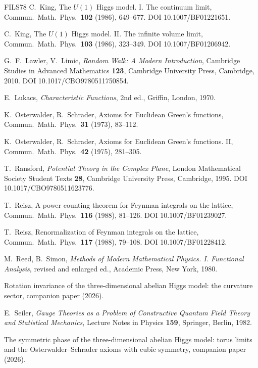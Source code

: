 \begin{thebibliography}{FILS78}
 C.~King, The $U(1)$ Higgs model. I. The continuum limit, Commun.\ Math.\ Phys.\ \textbf{102} (1986), 649--677. DOI 10.1007/BF01221651.

 C.~King, The $U(1)$ Higgs model. II. The infinite volume limit, Commun.\ Math.\ Phys.\ \textbf{103} (1986), 323--349. DOI 10.1007/BF01206942.

 G.~F.~Lawler, V.~Limic, \emph{Random Walk: A Modern Introduction}, Cambridge Studies in Advanced Mathematics \textbf{123}, Cambridge University Press, Cambridge, 2010. DOI 10.1017/CBO9780511750854.

 E.~Lukacs, \emph{Characteristic Functions}, 2nd ed., Griffin, London, 1970.

 K.~Osterwalder, R.~Schrader, Axioms for Euclidean Green's functions, Commun.\ Math.\ Phys.\ \textbf{31} (1973), 83--112.

 K.~Osterwalder, R.~Schrader, Axioms for Euclidean Green's functions. II, Commun.\ Math.\ Phys.\ \textbf{42} (1975), 281--305.

 T.~Ransford, \emph{Potential Theory in the Complex Plane}, London Mathematical Society Student Texts \textbf{28}, Cambridge University Press, Cambridge, 1995. DOI 10.1017/CBO9780511623776.

 T.~Reisz, A power counting theorem for Feynman integrals on the lattice, Commun.\ Math.\ Phys.\ \textbf{116} (1988), 81--126. DOI 10.1007/BF01239027.

 T.~Reisz, Renormalization of Feynman integrals on the lattice, Commun.\ Math.\ Phys.\ \textbf{117} (1988), 79--108. DOI 10.1007/BF01228412.

 M.~Reed, B.~Simon, \emph{Methods of Modern Mathematical Physics. I. Functional Analysis}, revised and enlarged ed., Academic Press, New York, 1980.

 Rotation invariance of the three-dimensional abelian Higgs model: the curvature sector, companion paper (2026).

 E.~Seiler, \emph{Gauge Theories as a Problem of Constructive Quantum Field Theory and Statistical Mechanics}, Lecture Notes in Physics \textbf{159}, Springer, Berlin, 1982.

 The symmetric phase of the three-dimensional abelian Higgs model: torus limits and the Osterwalder--Schrader axioms with cubic symmetry, companion paper (2026).

\end{thebibliography}
